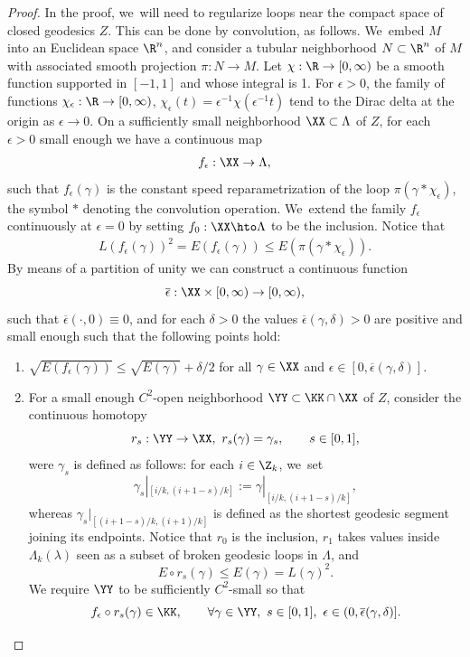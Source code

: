 \begin{proof}
In the proof, we~will need to regularize loops near the compact space of closed geodesics $Z$. This can be done by convolution, as follows. We~embed $M$ into an Euclidean space $\R^n$, and consider a tubular neighborhood $N\subset\R^n$ of $M$ with associated smooth projection $\pi:N\to M$. Let $\chi:\R\to[0,\infty)$ be a smooth function supported in $[-1,1]$ and whose integral is 1. For $\epsilon>0$, the family of functions
\hbox{$\chi_\epsilon:\R\to[0,\infty)$}, $\chi_\epsilon(t)=\epsilon^{-1}\chi(\epsilon^{-1}t)$
tend to the Dirac delta at the origin as $\epsilon\to0$. On a sufficiently small neighborhood $\XX\subset\Lambda$ of $Z$, for each $\epsilon>0$ small enough we have a continuous map
\begin{align*}
f_\epsilon:\XX \to \Lambda,
\end{align*}
such that $f_\epsilon(\gamma)$ is the constant speed reparametrization of the loop $\pi(\gamma*\chi_\epsilon)$, the symbol $*$ denoting the convolution operation. We~extend the family $f_\epsilon$ continuously at $\epsilon=0$ by setting $f_0:\XX \hto \Lambda$ to be the inclusion.
Notice that
\begin{align*}
L(f_\epsilon(\gamma))^2
=
E(f_\epsilon(\gamma))
\leq
E(\pi(\gamma*\chi_\epsilon)).
\end{align*}
By means of a partition of unity we can construct a continuous function
\[
\overline\epsilon:\XX\times[0,\infty)\to[0,\infty),
\]
such that $\overline\epsilon(\cdot,0)\equiv0$, and for each $\delta>0$ the values $\overline\epsilon(\gamma,\delta)>0$ are positive and small enough such that the following points hold:
\begin{enumerate}
\item\label{l:finitely_generatedi}
$\sqrt{E(f_\epsilon(\gamma))}\leq \sqrt{E(\gamma)}+\delta/2$ for all $\gamma\in\XX$ and $\epsilon\in[0,\overline\epsilon(\gamma,\delta)]$.

\item\label{l:finitely_generatedii}
For a small enough $C^2$-open neighborhood $\YY\subset\KK\cap\XX$ of $Z$,
consider the continuous homotopy
\[
r_s:\YY\to\XX,\ r_s(\gamma)=\gamma_s,\qquad s\in[0,1],
\]
were $\gamma_s$ is defined as follows: for each $i\in\Z_k$, we~set
\[
\gamma_s|_{[i/k,(i+1-s)/k]}:=\gamma|_{[i/k,(i+1-s)/k]},
\]
whereas $\gamma_s|_{[(i+1-s)/k,(i+1)/k]}$ is defined as the shortest geodesic segment joining its endpoints. Notice that $r_0$ is the inclusion, $r_1$ takes values inside $\Lambda_k(\lambda)$ seen as a subset of broken geodesic loops in $\Lambda$, and
\[
E\circ r_s(\gamma)\leq E(\gamma)= L(\gamma)^2.
\]
We require $\YY$ to be sufficiently $C^2$-small so that
\[
f_\epsilon\circ r_s(\gamma)\in\KK,\qquad\forall \gamma\in\YY,\ s\in[0,1],\ \epsilon\in(0,\overline\epsilon(\gamma,\delta)].
\]


\end{enumerate}
\end{proof}

